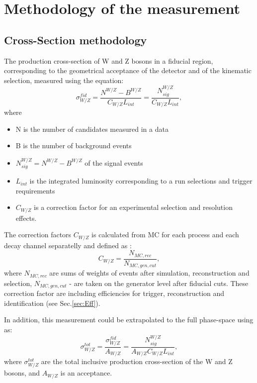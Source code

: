 \chapter{Methodology of the measurement}\label{chap:Met}
\minitoc
\section{Cross-Section methodology}

The production cross-section of W and Z bosons in a fiducial region, corresponding to the geometrical acceptance of the detector and of the kinematic selection, measured using the  equation:
\begin{equation}
\sigma^{fid}_{W/Z} = \frac{N^{W/Z}-B^{W/Z}}{C_{W/Z}L_{int}}=\frac{N^{W/Z}_{sig}}{C_{W/Z}L_{int}},
\end{equation}
where 
\begin{itemize}
\item N is the number of candidates measured in a data
\item B is the number of background events
\item $N^{W/Z}_{sig}=N^{W/Z}-B^{W/Z}$ of the signal events
\item $L_{int}$ is the integrated luminosity corresponding to a run selections and trigger requirements
\item $C_{W/Z}$ is a correction factor for an experimental selection and resolution effects.
\end{itemize}

The correction factors $C_{W/Z}$ is calculated from MC for each process and each decay channel separatelly and defined as :
\begin{equation}
C_{W/Z}=\frac{N_{MC, rec}}{N_{MC,gen, cut}}, 
\end{equation}
where $N_{MC, rec}$ are sums of weights of events after simulation, reconstruction and selection, $N_{MC,gen, cut}$ - are taken on the generator level after fiducial cuts. These correction factor are including efficiencies for trigger, reconstruction and identification (see Sec.\ref{sec:Eff}).

In addition, this measurement could be extrapolated to the full phase-space using as:
\begin{equation}
\sigma^{tot}_{W/Z}= \frac{\sigma^{fid}_{W/Z}}{A_{W/Z}}= \frac{N^{W/Z}_{sig}}{A_{W/Z}C_{W/Z}L_{int}},
\end{equation}
where $\sigma^{tot}_{W/Z}$ are the total inclusive production cross-section of the W and Z bosons, and $A_{W/Z}$  is an acceptance. 

